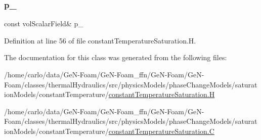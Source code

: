 \subsubsection{\texorpdfstring{p\+\_\+}{p\_}}
{\footnotesize\ttfamily const vol\+Scalar\+Field\& p\+\_\+\hspace{0.3cm}{\ttfamily [protected]}}



Definition at line 56 of file constant\+Temperature\+Saturation.\+H.



The documentation for this class was generated from the following files\+:\begin{DoxyCompactItemize}
\item 
/home/carlo/data/\+Ge\+N-\/\+Foam/\+Ge\+N-\/\+Foam\+\_\+ffn/\+Ge\+N-\/\+Foam/\+Ge\+N-\/\+Foam/classes/thermal\+Hydraulics/src/physics\+Models/phase\+Change\+Models/saturation\+Models/constant\+Temperature/\hyperlink{constantTemperatureSaturation_8H}{constant\+Temperature\+Saturation.\+H}\item 
/home/carlo/data/\+Ge\+N-\/\+Foam/\+Ge\+N-\/\+Foam\+\_\+ffn/\+Ge\+N-\/\+Foam/\+Ge\+N-\/\+Foam/classes/thermal\+Hydraulics/src/physics\+Models/phase\+Change\+Models/saturation\+Models/constant\+Temperature/\hyperlink{constantTemperatureSaturation_8C}{constant\+Temperature\+Saturation.\+C}\end{DoxyCompactItemize}
